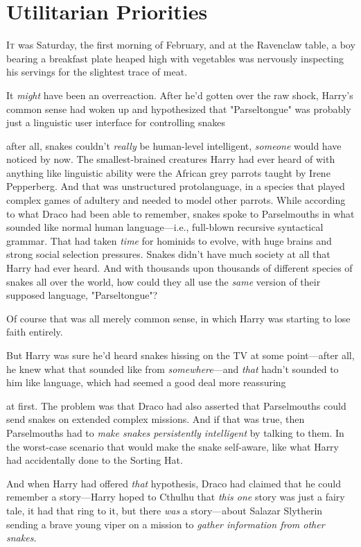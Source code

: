 \chapter{Utilitarian Priorities}

\lettrine{I}{t} was Saturday,
the first morning of February, and at the Ravenclaw table, a boy bearing a
breakfast plate heaped high with vegetables was nervously inspecting his
servings for the slightest trace of meat.

It \emph{might} have been an overreaction. After he'd gotten over the raw
shock, Harry's common sense had woken up and hypothesized that "Parseltongue"
was probably just a linguistic user interface for controlling snakes{\el}

{\el} after all, snakes couldn't \emph{really} be human-level intelligent,
\emph{someone} would have noticed by now. The smallest-brained creatures Harry
had ever heard of with anything like linguistic ability were the African grey
parrots taught by Irene Pepperberg. And that was unstructured protolanguage, in
a species that played complex games of adultery and needed to model other
parrots. While according to what Draco had been able to remember, snakes spoke
to Parselmouths in what sounded like normal human language---i.e., full-blown
recursive syntactical grammar. That had taken \emph{time} for hominids to
evolve, with huge brains and strong social selection pressures. Snakes didn't
have much society at all that Harry had ever heard. And with thousands upon
thousands of different species of snakes all over the world, how could they all
use the \emph{same} version of their supposed language, "Parseltongue"?

Of course that was all merely common sense, in which Harry was starting to lose
faith entirely.

But Harry was sure he'd heard snakes hissing on the TV at some point---after
all, he knew what that sounded like from \emph{somewhere}---and \emph{that}
hadn't sounded to him like language, which had seemed a good deal more
reassuring{\el}

{\el} at first. The problem was that Draco had also asserted that
Parselmouths could send snakes on extended complex missions. And if that was
true, then Parselmouths had to \emph{make snakes persistently intelligent} by
talking to them. In the worst-case scenario that would make the snake
self-aware, like what Harry had accidentally done to the Sorting Hat.

And when Harry had offered \emph{that} hypothesis, Draco had claimed that he
could remember a story---Harry hoped to Cthulhu that \emph{this one} story was
just a fairy tale, it had that ring to it, but there \emph{was} a story---about
Salazar Slytherin sending a brave young viper on a mission to \emph{gather
information from other snakes.}

